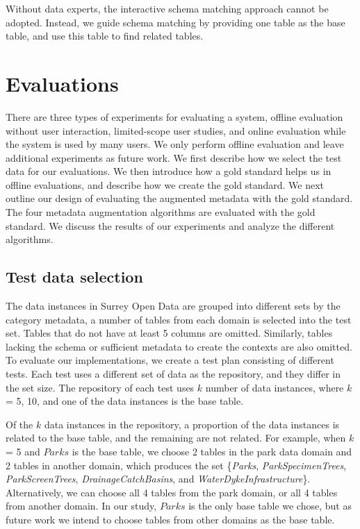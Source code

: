 Without data experts, the interactive schema matching approach cannot be adopted. Instead, we guide schema matching by providing one table as the base table, and use this table to find related tables.

\section{Evaluations}
\label{sec:Evaluations}

There are three types of experiments for evaluating a system, offline evaluation without user interaction, limited-scope user studies, and online evaluation while the system is used by many users. We only perform offline evaluation and leave additional experiments as future work. We first describe how we select the test data for our evaluations. We then introduce how a gold standard helps us in offline evaluations, and describe how we create the gold standard. We next outline our design of evaluating the augmented metadata with the gold standard. The four metadata augmentation algorithms are evaluated with the gold standard. We discuss the results of our experiments and analyze the different algorithms.

\subsection{Test data selection}
\label{ssec:TestDataSelection}

The data instances in Surrey Open Data are grouped into different sets by the category metadata, a number of tables from each domain is selected into the test set. Tables that do not have at least 5 columns are omitted. Similarly, tables lacking the schema or sufficient metadata to create the contexts are also omitted. To evaluate our implementations, we create a test plan consisting of different tests. Each test uses a different set of data as the repository, and they differ in the set size. The repository of each test uses $k$ number of data instances, where $k$ = 5, 10, and one of the data instances is the base table.

Of the $k$ data instances in the repository, a proportion of the data instances is related to the base table, and the remaining are not related. For example, when $k$ = 5 and $Parks$ is the base table, we choose 2 tables in the park data domain and 2 tables in another domain, which produces the set \{\textit{Parks}, \textit{ParkSpecimenTrees}, \textit{ParkScreenTrees}, \textit{DrainageCatchBasins}, and \textit{WaterDykeInfrastructure}\}. Alternatively, we can choose all 4 tables from the park domain, or all 4 tables from another domain. In our study, $Parks$ is the only base table we chose, but as future work we intend to choose tables from other domains as the base table.

